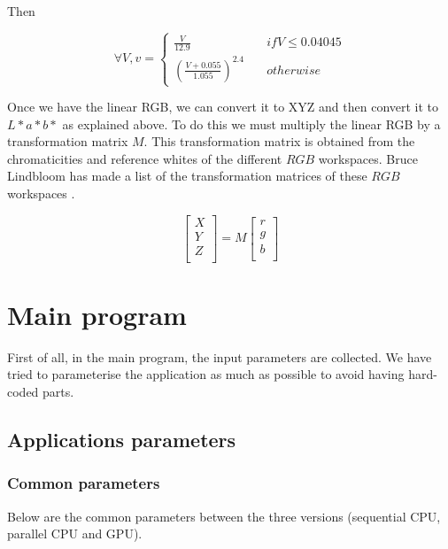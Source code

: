 \documentclass[titlepage,12pt]{report}
\begin{document}
Then

\begin{equation}
\forall V, v = \begin{cases} 
\frac{V}{12.9} & \quad if V \leq 0.04045 \\
\left( \frac{V + 0.055}{1.055} \right)^{2.4} & \quad otherwise
\end{cases}
\end{equation}

Once we have the linear RGB, we can convert it to XYZ and then convert it to $L*a*b*$ as explained above. To do this we must multiply the linear RGB by a transformation matrix $M$. This transformation matrix is obtained from the chromaticities and reference whites of the different $RGB$ workspaces. Bruce Lindbloom has made a list of the transformation matrices of these $RGB$ workspaces \citep{lindbloom_2017}.

\begin{equation}
\begin{bmatrix}
X \\ Y \\ Z\\ 
\end{bmatrix}
=
M
\begin{bmatrix}
r \\ g \\ b \\
\end{bmatrix}
\end{equation}

\section{Main program}

First of all, in the main program, the input parameters are collected. We have tried to parameterise the application as much as possible to avoid having hard-coded parts.

\subsection{Applications parameters}

\subsubsection{Common parameters}

Below are the common parameters between the three versions (sequential CPU, parallel CPU and GPU).
\end{document}
